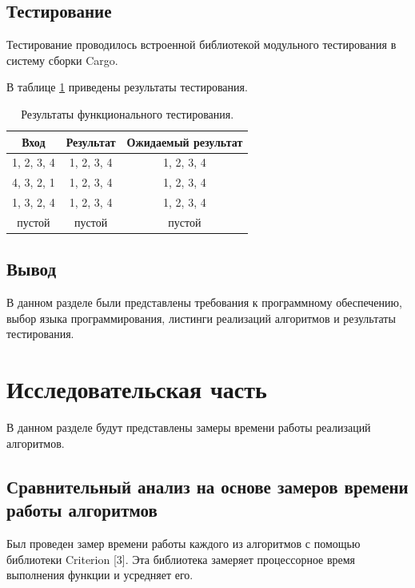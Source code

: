 \documentclass[14pt,russian]{scrartcl}
\begin{document}
\clearpage

\subsection{Тестирование}

Тестирование проводилось встроенной библиотекой модульного тестирования в систему сборки Cargo.

В таблице \ref{tab:tests} приведены результаты тестирования.

\begin{table}[h]
    \caption{\centering Результаты функционального тестирования.}
    \centering
    \begin{tabular}{|c|c|c|}
    \hline
    Вход       & Результат  & Ожидаемый результат \\ \hline
    1, 2, 3, 4 & 1, 2, 3, 4 & 1, 2, 3, 4          \\ \hline
    4, 3, 2, 1 & 1, 2, 3, 4 & 1, 2, 3, 4          \\ \hline
    1, 3, 2, 4 & 1, 2, 3, 4 & 1, 2, 3, 4          \\ \hline
    пустой     & пустой     & пустой              \\ \hline
    \end{tabular}
    \label{tab:tests}
\end{table}


\subsection*{Вывод}

В данном разделе были представлены требования к программному обеспечению, выбор языка программирования, листинги реализаций алгоритмов и результаты тестирования.

\section{Исследовательская часть}

В данном разделе будут представлены замеры времени работы реализаций алгоритмов.

\subsection{Сравнительный анализ на основе замеров времени работы алгоритмов}
	
	Был проведен замер времени работы каждого из алгоритмов с помощью библиотеки Criterion [3]. Эта библиотека замеряет процессорное время выполнения функции и усредняет его.
\end{document}
